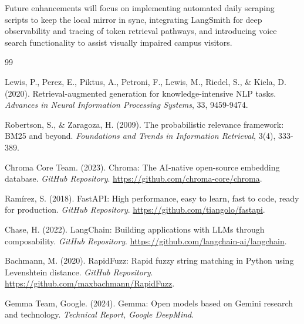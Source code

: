 \documentclass[12pt,a4paper]{article}
\begin{document}
Future enhancements will focus on implementing automated daily scraping scripts to keep the local mirror in sync, integrating LangSmith for deep observability and tracing of token retrieval pathways, and introducing voice search functionality to assist visually impaired campus visitors.

\newpage
\begin{thebibliography}{99}

Lewis, P., Perez, E., Piktus, A., Petroni, F., Lewis, M., Riedel, S., \& Kiela, D. (2020).
Retrieval-augmented generation for knowledge-intensive NLP tasks.
\textit{Advances in Neural Information Processing Systems}, 33, 9459-9474.

Robertson, S., \& Zaragoza, H. (2009).
The probabilistic relevance framework: BM25 and beyond.
\textit{Foundations and Trends in Information Retrieval}, 3(4), 333-389.

Chroma Core Team. (2023).
Chroma: The AI-native open-source embedding database.
\textit{GitHub Repository}. \url{https://github.com/chroma-core/chroma}.

Ramírez, S. (2018).
FastAPI: High performance, easy to learn, fast to code, ready for production.
\textit{GitHub Repository}. \url{https://github.com/tiangolo/fastapi}.

Chase, H. (2022).
LangChain: Building applications with LLMs through composability.
\textit{GitHub Repository}. \url{https://github.com/langchain-ai/langchain}.

Bachmann, M. (2020).
RapidFuzz: Rapid fuzzy string matching in Python using Levenshtein distance.
\textit{GitHub Repository}. \url{https://github.com/maxbachmann/RapidFuzz}.

Gemma Team, Google. (2024).
Gemma: Open models based on Gemini research and technology.
\textit{Technical Report, Google DeepMind}.

\end{thebibliography}
\end{document}
